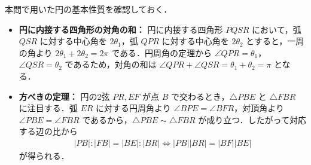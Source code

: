 \documentclass[../../main.tex]{subfiles}
\begin{document}
本問で用いた円の基本性質を確認しておく．
\begin{itemize}
  \item {\bf 円に内接する四角形の対角の和：}
    円に内接する四角形 $PQSR$ において，弧 $QSR$ に対する中心角を $2\theta_1$，弧 $QPR$ に対する中心角を $2\theta_2$ とすると，一周の角より $2\theta_1 + 2\theta_2 = 2\pi$ である．円周角の定理から $\angle QPR = \theta_1$，$\angle QSR = \theta_2$ であるため，対角の和は $\angle QPR + \angle QSR = \theta_1 + \theta_2 = \pi$ となる．
  \item {\bf 方べきの定理：}
    円の2弦 $PR, EF$ が点 $B$ で交わるとき，$\triangle PBE$ と $\triangle FBR$ に注目する．弧 $ER$ に対する円周角より $\angle BPE = \angle BFR$，対頂角より $\angle PBE = \angle FBR$ であるから，$\triangle PBE \sim \triangle FBR$ が成り立つ．したがって対応する辺の比から
    \begin{align}
      |PB| : |FB| = |BE| : |BR| \iff |PB||BR| = |BF||BE|
    \end{align}
    が得られる．
\end{itemize}

\newpage
\end{document}
